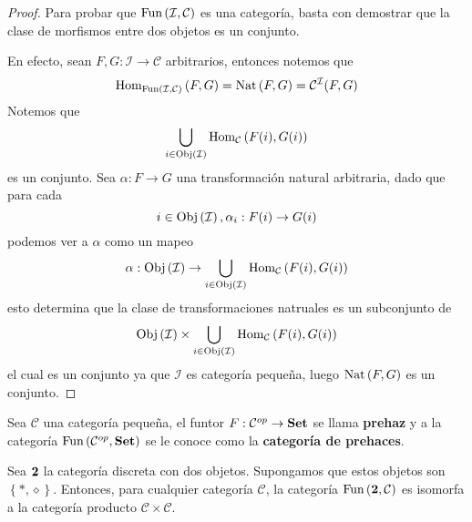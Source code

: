 \documentclass[12pt]{report}
\newcounter{it}
\theoremstyle{largebreak}
\newcommand\cf[3]{\ensuremath{#1:#2\rightarrow#3}}
\newcommand{\Obj}[1]{\ensuremath{\textup{Obj}\left(#1\right)}}
\newcommand{\Hom}[3]{\ensuremath{\textup{Hom}_{#1}\left(#2,#3\right)}}
\newcommand{\Cat}[1]{\ensuremath{\textup{\textbf{#1}}}}
\newcommand{\Fun}[2]{\ensuremath{\textup{Fun}\left(#1,#2\right)}}
\begin{document}
    \begin{proof}
        Para probar que $\Fun{\mathcal{I}}{\mathcal{C}}$ es una categoría, basta con demostrar que la clase de morfismos entre dos objetos es un conjunto.

        En efecto, sean $\cf{F,G}{\mathcal{I}}{\mathcal{C}}$ arbitrarios, entonces notemos que
        \begin{equation*}
            \Hom{\Fun{\mathcal{I}}{\mathcal{C}}}{F}{G}=\Nat{F}{G}=\mathcal{C}^{\mathcal{I}}(F,G)
        \end{equation*}
        Notemos que
        \begin{equation*}
            \bigcup_{ i\in\Obj{\mathcal{I}}}\Hom{\mathcal{C}}{F(i)}{G(i)}
        \end{equation*}
        es un conjunto. Sea $\cf{\alpha}{F}{G}$ una transformación natural arbitraria, dado que para cada
        \begin{equation*}
            i\in\Obj{\mathcal{I}},\cf{\alpha_i}{F(i)}{G(i)}
        \end{equation*}
        podemos ver a $\alpha$ como un mapeo
        \begin{equation*}
            \cf{\alpha}{\Obj{\mathcal{I}}}{\bigcup_{ i\in\Obj{\mathcal{I}}}\Hom{\mathcal{C}}{F(i)}{G(i)} }
        \end{equation*}
        esto determina que la clase de transformaciones natruales es un subconjunto de
        \begin{equation*}
            \Obj{\mathcal{I}}\times \bigcup_{i\in\Obj{\mathcal{I}}}\Hom{\mathcal{C}}{F(i)}{G(i)}
        \end{equation*}
        el cual es un conjunto ya que $\mathcal{I}$ es categoría pequeña, luego $\textup{Nat}\left(F,G\right)$ es un conjunto.
    \end{proof}

    \begin{exa}
        Sea $\mathcal{C}$ una categoría pequeña, el funtor $\cf{F}{\mathcal{C}^{op}}{\Cat{Set}}$ se llama \textbf{prehaz} y a la categoría $\Fun{\mathcal{C}^{op}}{\Cat{Set}}$ se le conoce como la \textbf{categoría de prehaces}.
    \end{exa}

    \begin{exa}
        Sea $\Cat{2}$ la categoría discreta con dos objetos. Supongamos que estos objetos son $\left\{*,\diamond\right\}$. Entonces, para cualquier categoría $\mathcal{C}$, la categoría $\Fun{\Cat{2}}{\mathcal{C}}$ es isomorfa a la categoría producto $\mathcal{C}\times\mathcal{C}$.
    \end{exa}
\end{document}
